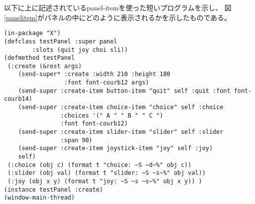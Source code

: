 \begin{refdesc}




\end{refdesc}

以下に上に記述されているpanel-itemを使った短いプログラムを示し、
図 \ref{panelitem}がパネルの中にどのように表示されるかを示したものである。

\begin{verbatim}
(in-package "X")
(defclass testPanel :super panel
        :slots (quit joy choi sli))
(defmethod testPanel
 (:create (&rest args)
    (send-super* :create :width 210 :height 180 
                 :font font-courb12 args)
    (send-super :create-item button-item "quit" self :quit :font font-courb14)
    (send-super :create-item choice-item "choice" self :choice
                :choices '(" A " " B " " C ")
                :font font-courb12)
    (send-super :create-item slider-item "slider" self :slider
                :span 90)
    (send-super :create-item joystick-item "joy" self :joy)
    self)
 (:choice (obj c) (format t "choice: ~S ~d~%" obj c))
 (:slider (obj val) (format t "slider: ~S ~s~%" obj val))
 (:joy (obj x y) (format t "joy: ~S ~s ~s~%" obj x y)) )
(instance testPanel :create)
(window-main-thread)
\end{verbatim}

